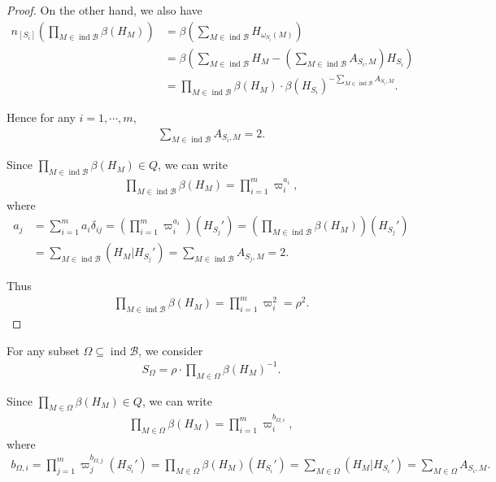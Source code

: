 \documentclass[12pt]{amsart}
\begin{document}
\begin{proof}
    On the other hand, we also have 
    \begin{align*}
        n_{[S_i]}(\prod_{M\in \operatorname{ind}\mathcal{B}} \beta(H_M)) &= \beta(\sum_{M\in \operatorname{ind}\mathcal{B}} H_{\omega_{S_i}(M)}) \\
        &= \beta(\sum_{M\in \operatorname{ind}\mathcal{B}} H_M -(\sum_{M\in \operatorname{ind}\mathcal{B}} A_{S_i,M})H_{S_i} ) \\
        &= \prod_{M\in \operatorname{ind}\mathcal{B}} \beta(H_M) \cdot \beta(H_{S_i})^{-\sum_{M\in \operatorname{ind}\mathcal{B}} A_{S_i,M}}.
    \end{align*}

    Hence for any $i=1,\cdots,m$, 
    \begin{align*}
        \sum_{M\in \operatorname{ind}\mathcal{B}} A_{S_i,M} = 2.
    \end{align*}

    Since $ \prod_{M\in \operatorname{ind}\mathcal{B}} \beta(H_M) \in Q$, we can write 
    \begin{align*}
         \prod_{M\in \operatorname{ind}\mathcal{B}} \beta(H_M) = \prod_{i=1}^m \varpi_i^{a_i},
    \end{align*}
    where 
    \begin{align*}
        a_j &= \sum_{i=1}^m a_i \delta_{ij} = (\prod_{i=1}^m \varpi_i^{a_i}) (H_{S_j}') = (\prod_{M\in \operatorname{ind}\mathcal{B}} \beta(H_M)) (H_{S_j}')\\
         &=  \sum_{M\in \operatorname{ind}\mathcal{B}} (H_M|H_{S_j}') =  \sum_{M\in \operatorname{ind}\mathcal{B}} A_{S_j,M} = 2.
    \end{align*}

    Thus 
    \begin{align*}
        \prod_{M\in \operatorname{ind}\mathcal{B}} \beta(H_M) = \prod_{i=1}^m \varpi_i^2 = \rho^2.
    \end{align*}
   
\end{proof}


For any subset $\Omega \subseteq \operatorname{ind}\mathcal{B}$, we consider  
\begin{align*}
   S_{\Omega} =  \rho \cdot \prod_{M\in \Omega} \beta(H_M)^{-1}.
\end{align*}

Since $\prod_{M\in \Omega} \beta(H_M)\in Q$, we can write 
\begin{align*}
    \prod_{M\in \Omega} \beta(H_M) = \prod_{i=1}^m \varpi_i^{b_{\Omega,i}},
\end{align*}
where 
\begin{align*}
    b_{\Omega,i} = \prod_{j=1}^m \varpi_j^{b_{\Omega,j}}(H_{S_i}') = \prod_{M\in \Omega}\beta(H_M)(H_{S_i}') = \sum_{M\in\Omega} (H_M|H_{S_i}') = \sum_{M\in \Omega} A_{S_i,M}.
\end{align*}
\end{document}
